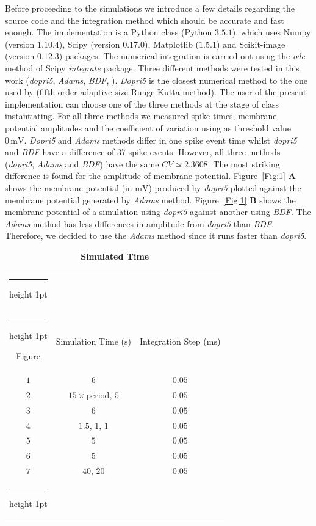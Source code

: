 \documentclass[10pt,a4paper,onecolumn]{article}
\makeatletter
\newcommand{\Rm}[1]{\mathrm{#1}}
\newcommand{\thickhline}{%
    \noalign {\ifnum 0=`}\fi \hrule height 1pt
    \futurelet \reserved@a \@xhline
}
\makeatother
\begin{document}
Before proceeding to the simulations we introduce a few details regarding 
the source code and the integration method which should be accurate and fast
enough. The implementation is a Python class (Python $3.5.1$), which uses
Numpy (version $1.10.4$), Scipy (version $0.17.0$), Matplotlib
($1.5.1$) and Scikit-image (version $0.12.3$) packages. The numerical
integration is carried out using the \emph{ode} method of Scipy 
\emph{integrate} package. Three different methods were tested in this work 
(\emph{dopri5}, \emph{Adams}, \emph{BDF}, \cite{ascher:1998}). \emph{Dopri5}
is the closest numerical method to the one used by \cite{wang:1994}
(fifth-order adaptive size Runge-Kutta method). The user of the present 
implementation can choose one of the three methods at the stage of class
instantiating. For all three methods we measured spike times, membrane
potential amplitudes and the coefficient of variation using as threshold value
$0\, \Rm{mV}$. \emph{Dopri5} and \emph{Adams} methods differ in one spike 
event time whilst \emph{dopri5} and \emph{BDF} have a difference of 37 spike
events. However, all three methods (\emph{dopri5}, \emph{Adams} and \emph{BDF})
have the same $CV \simeq 2.3608$. The most striking difference is found for the
amplitude of membrane potential. Figure~\ref{Fig:1} {\bfseries \sffamily A}
shows the membrane potential (in $\Rm{mV}$) produced by \emph{dopri5} plotted 
against the membrane potential generated by \emph{Adams} method.
Figure~\ref{Fig:1} {\bfseries \sffamily B} shows the membrane potential
of a simulation using \emph{dopri5} against another using \emph{BDF}. The 
\emph{Adams} method has less differences in amplitude from \emph{dopri5} 
than \emph{BDF}. Therefore, we decided to use the \emph{Adams} method 
since it runs faster than \emph{dopri5}. 
\begin{table}[!htbp]
    \centering
    \begin{tabular}{ccc}
        \thickhline
        \multicolumn{3}{c}{Simulated Time} \\ \thickhline
        Figure & Simulation Time ($\Rm{s}$) & Integration Step ($\Rm{ms}$) \\ 
        \rowcolor{LightGray}
        $1$ & $6$ & $0.05$ \\ \rowcolor{Gray}
        $2$ & $15\times \text{period}$, $5$ & $0.05$ \\ \rowcolor{LightGray}
        $3$ & $6$ & $0.05$ \\ \rowcolor{Gray} 
        $4$ & $1.5$, $1$, $1$ & $0.05$ \\ \rowcolor{LightGray} 
        $5$ & $5$ & $0.05$  \\ \rowcolor{Gray} 
        $6$ & $5$ & $0.05$  \\ \rowcolor{LightGray} 
        $7$ & $40$, $20$ & $0.05$  \\ \thickhline
    \end{tabular}
    \caption{{\bfseries \sffamily Simulated Time}}
    \label{Table:2}
\end{table}
\end{document}
